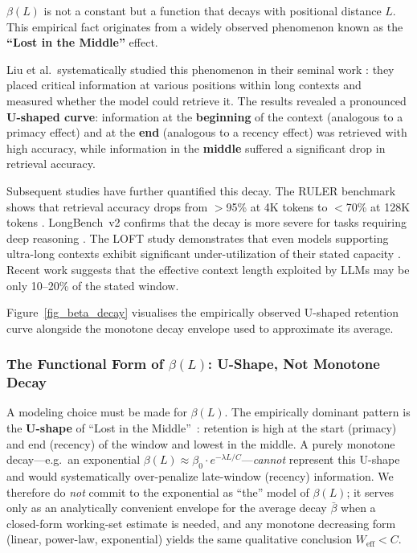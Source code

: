 $\beta(L)$ is not a constant but a function that decays with positional distance $L$. This empirical fact originates from a widely observed phenomenon known as the \textbf{``Lost in the Middle''} effect.

Liu et al.\ systematically studied this phenomenon in their seminal work \cite{liu2023lostmiddle}: they placed critical information at various positions within long contexts and measured whether the model could retrieve it. The results revealed a pronounced \textbf{U-shaped curve}: information at the \textbf{beginning} of the context (analogous to a primacy effect) and at the \textbf{end} (analogous to a recency effect) was retrieved with high accuracy, while information in the \textbf{middle} suffered a significant drop in retrieval accuracy.

Subsequent studies have further quantified this decay. The RULER benchmark shows that retrieval accuracy drops from $>$95\% at 4K tokens to $<$70\% at 128K tokens \cite{ruler2024}. LongBench~v2 confirms that the decay is more severe for tasks requiring deep reasoning \cite{longbenchv2_2024}. The LOFT study demonstrates that even models supporting ultra-long contexts exhibit significant under-utilization of their stated capacity \cite{loft2024}. Recent work suggests that the effective context length exploited by LLMs may be only 10--20\% of the stated window.

Figure~\ref{fig_beta_decay} visualises the empirically observed U-shaped retention curve alongside the monotone decay envelope used to approximate its average.


\subsubsection{The Functional Form of $\beta(L)$: U-Shape, Not Monotone Decay}

A modeling choice must be made for $\beta(L)$. The empirically dominant pattern is the \textbf{U-shape} of ``Lost in the Middle''~\cite{liu2023lostmiddle}: retention is high at the start (primacy) and end (recency) of the window and lowest in the middle. A purely monotone decay---e.g.\ an exponential $\beta(L) \approx \beta_{0} \cdot e^{-\lambda L / C}$---\emph{cannot} represent this U-shape and would systematically over-penalize late-window (recency) information. We therefore do \emph{not} commit to the exponential as ``the'' model of $\beta(L)$; it serves only as an analytically convenient envelope for the average decay $\bar{\beta}$ when a closed-form working-set estimate is needed, and any monotone decreasing form (linear, power-law, exponential) yields the same qualitative conclusion $W_{\mathrm{eff}} < C$.


